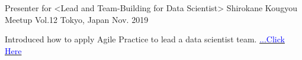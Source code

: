 

\begin{cventries}

  \cventry
    {Presenter for <Lead and Team-Building for Data Scientist>} %
    {Shirokane Kougyou Meetup Vol.12} %
    {Tokyo, Japan} %
    {Nov. 2019} %
    {
      \begin{cvitems} %
        \item {Introduced how to apply Agile Practice to lead a data scientist team. \href{https://brainpad-meetup.connpass.com/event/147202/}{\textcolor{blue}{...Click Here}}}
      \end{cvitems}
    }


\end{cventries}
